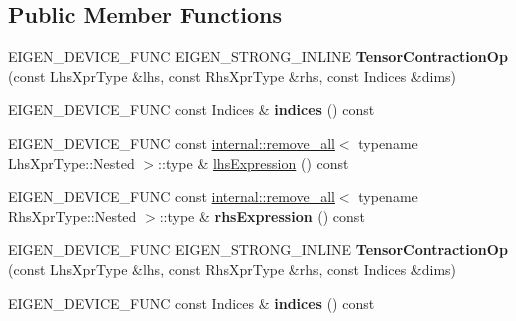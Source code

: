 \subsection*{Public Member Functions}
\begin{DoxyCompactItemize}
\item 
\mbox{\label{class_eigen_1_1_tensor_contraction_op_acc33200398e6a8cbfdb772b631933019}} 
E\+I\+G\+E\+N\+\_\+\+D\+E\+V\+I\+C\+E\+\_\+\+F\+U\+NC E\+I\+G\+E\+N\+\_\+\+S\+T\+R\+O\+N\+G\+\_\+\+I\+N\+L\+I\+NE {\bfseries Tensor\+Contraction\+Op} (const Lhs\+Xpr\+Type \&lhs, const Rhs\+Xpr\+Type \&rhs, const Indices \&dims)
\item 
\mbox{\label{class_eigen_1_1_tensor_contraction_op_af4f3a67f5b8f3cda31e7629d0ca677d5}} 
E\+I\+G\+E\+N\+\_\+\+D\+E\+V\+I\+C\+E\+\_\+\+F\+U\+NC const Indices \& {\bfseries indices} () const
\item 
E\+I\+G\+E\+N\+\_\+\+D\+E\+V\+I\+C\+E\+\_\+\+F\+U\+NC const \hyperlink{struct_eigen_1_1internal_1_1remove__all}{internal\+::remove\+\_\+all}$<$ typename Lhs\+Xpr\+Type\+::\+Nested $>$\+::type \& \hyperlink{class_eigen_1_1_tensor_contraction_op_a1e3bb92babac5554f7164b12e9654daa}{lhs\+Expression} () const
\item 
\mbox{\label{class_eigen_1_1_tensor_contraction_op_a93b684d992dd1936b99b9b9ec360251f}} 
E\+I\+G\+E\+N\+\_\+\+D\+E\+V\+I\+C\+E\+\_\+\+F\+U\+NC const \hyperlink{struct_eigen_1_1internal_1_1remove__all}{internal\+::remove\+\_\+all}$<$ typename Rhs\+Xpr\+Type\+::\+Nested $>$\+::type \& {\bfseries rhs\+Expression} () const
\item 
\mbox{\label{class_eigen_1_1_tensor_contraction_op_acc33200398e6a8cbfdb772b631933019}} 
E\+I\+G\+E\+N\+\_\+\+D\+E\+V\+I\+C\+E\+\_\+\+F\+U\+NC E\+I\+G\+E\+N\+\_\+\+S\+T\+R\+O\+N\+G\+\_\+\+I\+N\+L\+I\+NE {\bfseries Tensor\+Contraction\+Op} (const Lhs\+Xpr\+Type \&lhs, const Rhs\+Xpr\+Type \&rhs, const Indices \&dims)
\item 
\mbox{\label{class_eigen_1_1_tensor_contraction_op_af4f3a67f5b8f3cda31e7629d0ca677d5}} 
E\+I\+G\+E\+N\+\_\+\+D\+E\+V\+I\+C\+E\+\_\+\+F\+U\+NC const Indices \& {\bfseries indices} () const

\end{DoxyCompactItemize}
